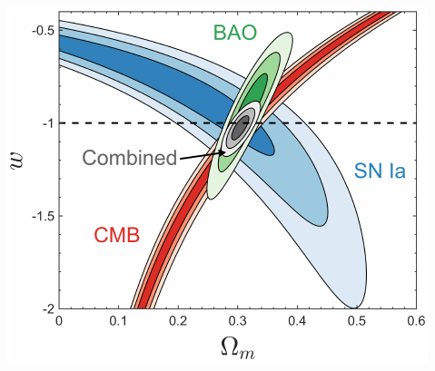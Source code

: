 \documentclass[aspectratio=169]{beamer}
\begin{document}
\begin{frame}
\begin{columns}
\begin{columns}
        \includegraphics[width=\textwidth]{figures/parameters}
            
        \end{columns}
    \end{columns}
\end{frame}

{
    \begin{frame}[plain]
    \end{frame}
}
\end{document}
